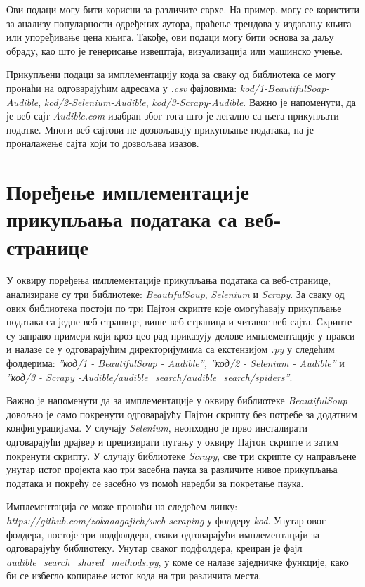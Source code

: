 \documentclass[12pt,oneside]{memoir}
\begin{document}
Ови подаци могу бити корисни за различите сврхе. На пример, могу се користити за анализу популарности одређених аутора, праћење трендова у издавању књига или упоређивање цена књига. Такође, ови подаци могу бити основа за даљу обраду, као што је генерисање извештаја, визуализација или машинско учење.

Прикупљени подаци за имплементацију кода за сваку од библиотека се могу пронаћи на одговарајућим адресама у \textit{.csv} фајловима: \textit{kod/1-BeautifulSoap-Audible}, \textit{kod/2-Selenium-Audible}, \textit{kod/3-Scrapy-Audible}. Важно је напоменути, да је веб-сајт \textit{Audible.com} изабран због тога што је легално са њега прикупљати податке. Многи веб-сајтови не дозвољавају прикупљање података, па је проналажење сајта који то дозвољава изазов. 

\section{Поређење имплементације прикупљања података са веб-странице}

У оквиру поређења имплементације прикупљања података са веб-странице, анализиране су три библиотеке: \textit{BeautifulSoup}, \textit{Selenium} и \textit{Scrapy}. За сваку од ових библиотека постоји по три Пајтон скрипте које омогућавају прикупљање података са једне веб-странице, више веб-страница и читавог веб-сајта. 
Скрипте су заправо примери који кроз цео рад приказују делове имплементације у пракси и налазе се у одговарајућим директоријумима са екстензијом \textit{.py} у следећим фолдерима: \textit{''код/1 - BeautifulSoup - Audible'', ''код/2 - Selenium - Audible''} и \textit{''код/3 - Scrapy -Audible/audible\_search/audible\_search/spiders''}.

Важно је напоменути да за имплементације у оквиру библиотеке \textit{BeautifulSoup} довољно је само покренути одговарајућу Пајтон скрипту без потребе за додатним конфигурацијама. У случају \textit{Selenium}, неопходно је прво инсталирати одговарајући драјвер и прецизирати путању у оквиру Пајтон скрипте и затим покренути скрипту. У случају библиотеке \textit{Scrapy}, све три скрипте су направљене унутар истог пројекта као три засебна паука за различите нивое прикупљања података и покрећу се засебно уз помоћ наредби за покретање паука. 

Имплементација се може пронаћи на следећем линку: \textit{https://github.com/zokaaagajich/web-scraping} у фолдеру \textit{kod}. Унутар овог фолдера, постоје три подфолдера, сваки одговарајући имплементацији за одговарајућу библиотеку. Унутар сваког подфолдера, креиран је фајл \textit{audible\_search\_shared\_methods.py}, у коме се налазе заједничке функције, како би се избегло копирање истог кода на три различита места.
\end{document}
